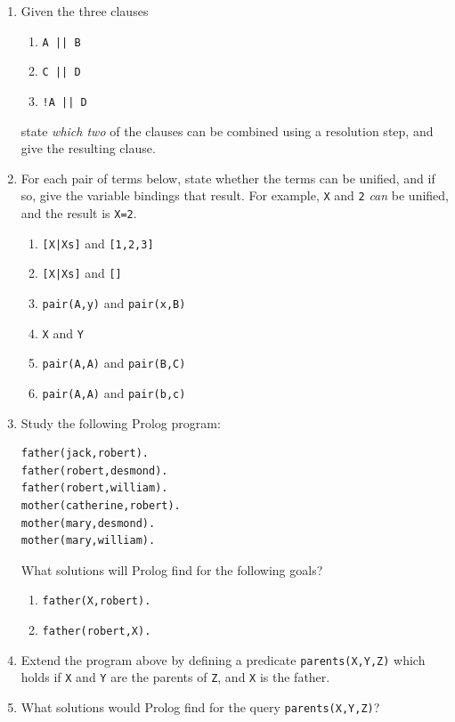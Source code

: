 \documentclass{article}
\begin{document}
\begin{enumerate}
\item
Given the three clauses
\begin{enumerate}
\item \verb!A || B!
\item \verb!C || D!
\item \verb?!A || D?
\end{enumerate}
state {\em which two} of the clauses can be combined using a resolution step, and give the resulting clause.

\item
For each pair of terms below, state whether the terms can be unified,
and if so, give the variable bindings that result. For example,
\verb!X! and \verb!2! {\em can} be unified, and the result is
\verb!X=2!.
\begin{enumerate}
\item \verb![X|Xs]! and \verb![1,2,3]!
\item \verb![X|Xs]! and \verb![]!
\item \verb!pair(A,y)! and \verb!pair(x,B)!
\item \verb!X! and \verb!Y!
\item \verb!pair(A,A)! and \verb!pair(B,C)!
\item \verb!pair(A,A)! and \verb!pair(b,c)!
\end{enumerate}

\item
Study the following Prolog program:
\begin{verbatim}
father(jack,robert).
father(robert,desmond).
father(robert,william).
mother(catherine,robert).
mother(mary,desmond).
mother(mary,william).
\end{verbatim}
What solutions will Prolog find for the following goals?
\begin{enumerate}
\item \verb!father(X,robert).!
\item \verb!father(robert,X).!
\end{enumerate}

\item
Extend the program above by defining a predicate \verb!parents(X,Y,Z)!
which holds if \verb!X! and \verb!Y! are the parents of \verb!Z!, and
\verb!X! is the father.

\item 
What solutions would Prolog find for the query \verb!parents(X,Y,Z)!?


\end{enumerate}
\end{document}
